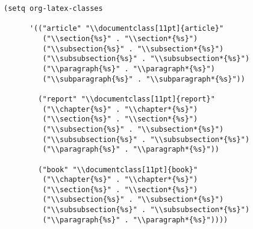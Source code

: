 \documentclass[11pt]{report}
\begin{document}
\lstset{language=Lisp,label= ,caption= ,captionpos=b,numbers=none}
\begin{lstlisting}
(setq org-latex-classes

      '(("article" "\\documentclass[11pt]{article}"
         ("\\section{%s}" . "\\section*{%s}")
         ("\\subsection{%s}" . "\\subsection*{%s}")
         ("\\subsubsection{%s}" . "\\subsubsection*{%s}")
         ("\\paragraph{%s}" . "\\paragraph*{%s}")
         ("\\subparagraph{%s}" . "\\subparagraph*{%s}"))

        ("report" "\\documentclass[11pt]{report}"
         ("\\chapter{%s}" . "\\chapter*{%s}")
         ("\\section{%s}" . "\\section*{%s}")
         ("\\subsection{%s}" . "\\subsection*{%s}")
         ("\\subsubsection{%s}" . "\\subsubsection*{%s}")
         ("\\paragraph{%s}" . "\\paragraph*{%s}"))

        ("book" "\\documentclass[11pt]{book}"
         ("\\chapter{%s}" . "\\chapter*{%s}")
         ("\\section{%s}" . "\\section*{%s}")
         ("\\subsection{%s}" . "\\subsection*{%s}")
         ("\\subsubsection{%s}" . "\\subsubsection*{%s}")
         ("\\paragraph{%s}" . "\\paragraph*{%s}"))))
\end{lstlisting}
\end{document}
